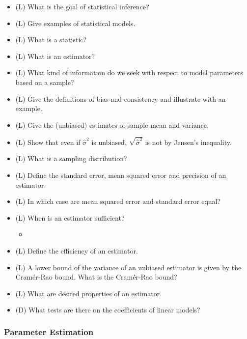 \begin{itemize}
    \item (L) What is the goal of statistical inference?
    \item (L) Give examples of statistical models.
    \item (L) What is a statistic?
    \item (L) What is an estimator?
    \item (L) What kind of information do we seek with respect to model parameters based on a sample?
    \item (L) Give the definitions of bias and consistency and illustrate with an example.
    \item (L) Give the (unbiased) estimates of sample mean and variance.
    \item (L) Show that even if $\hat{\sigma}^2$ is unbiased, $\sqrt{\hat{\sigma}^2}$ is not by Jensen's inequality.
    \item (L) What is a sampling distribution?
    \item (L) Define the standard error, mean squared error and precision of an estimator.
    \item (L) In which case are mean squared error and standard error equal?
    \item (L) When is an estimator sufficient?
    \begin{itemize}
        \item {}
    \end{itemize}
    \item (L) Define the efficiency of an estimator.
    \item (L) A lower bound of the variance of an unbiased estimator is given by the Cramér-Rao bound. What is the Cramér-Rao bound?
    \item (L) What are desired properties of an estimator.
    \item (D) What tests are there on the coefficients of linear models?
\end{itemize}

\subsubsection*{Parameter Estimation}

